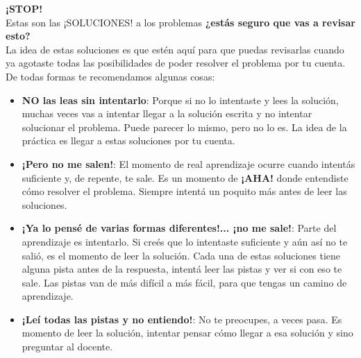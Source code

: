 \begin{tcolorbox}[colback=red,colframe=red!75!black,arc=0pt,outer arc=0pt]
  \textbf{¡STOP!} \\

Estas son las ¡SOLUCIONES! a los problemas \textbf{¿estás seguro que vas a revisar esto?} \\
La idea de estas soluciones es que estén aquí para que puedas revisarlas cuando ya agotaste todas las posibilidades de 
poder resolver el problema por tu cuenta. De todas formas te recomendamos algunas cosas:

\begin{itemize}
\item \textbf{NO las leas sin intentarlo}: Porque si no lo intentaste y lees la solución, muchas veces vas a intentar
  llegar a la solución escrita y no intentar solucionar el problema. Puede parecer lo mismo, pero no lo es. La idea de
  la práctica es llegar a estas soluciones por tu cuenta.

\item \textbf{¡Pero no me salen!}: El momento de real aprendizaje ocurre cuando intentás suficiente y, de repente, te
  sale. Es un momento de \textbf{¡AHA!} donde entendiste cómo resolver el problema. Siempre intentá un poquito más antes
  de leer las soluciones.

\item \textbf{¡Ya lo pensé de varias formas diferentes!... ¡no me sale!}: Parte del aprendizaje es intentarlo. Si creés
  que lo intentaste suficiente y aún así no te salió, es el momento de leer la solución. Cada una de estas soluciones
  tiene alguna pista antes de la respuesta, intentá leer las pistas y ver si con eso te sale. Las pistas van de más
  difícil a más fácil, para que tengas un camino de aprendizaje.

\item \textbf{¡Leí todas las pistas y no entiendo!}: No te preocupes, a veces pasa. Es momento de leer la solución,
  intentar pensar cómo llegar a esa solución y sino preguntar al docente.

\end{itemize}
\end{tcolorbox}
